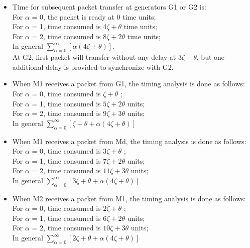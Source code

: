 \documentclass[letterpaper]{article}
\begin{document}
\begin{itemize}
	\item Time for subsequent packet transfer at generators G1 or G2 is:\\ For $\alpha$ = 0, the packet is ready at 0 time units;
\\ For $\alpha$ = 1, time consumed is 4$\zeta+\theta$ time units;
\\ For $\alpha$ = 2, time consumed is 8$\zeta+2\theta$ time units;
\\ In general $\displaystyle\sum\limits_{\alpha=0}^{\infty} [\alpha(4\zeta+\theta)]$.\\

At G2, first packet will transfer without any delay at $3\zeta+\theta$, but one additional delay is provided to synchronize with G2. 

\item When M1 receives a packet from G1, the timing analysis is done as follows:
\\ For $\alpha$ = 0, time consumed is $\zeta+\theta$ ;
\\For $\alpha$ = 1, time consumed is $5\zeta+2\theta$ units;
\\For $\alpha$ = 2, time consumed is $9\zeta+3\theta$ units;
\\ In general $\displaystyle\sum\limits_{\alpha=0}^{\infty} [\zeta+\theta+\alpha(4\zeta+\theta)]$ 

\item When M1 receives a packet from Md, the timing analysis is done as follows:
\\ For $\alpha$ = 0, time consumed is $3\zeta+\theta$ ;
\\For $\alpha$ = 1, time consumed is $7\zeta+2\theta$ units;
\\For $\alpha$ = 2, time consumed is $11\zeta+3\theta$ units;
\\ In general $\displaystyle\sum\limits_{\alpha=0}^{\infty} [3\zeta+\theta+\alpha(4\zeta+\theta)]$ 

\item When M2 receives a packet from M1, the timing analysis is done as follows:
\\ For $\alpha$ = 0, time consumed is $2\zeta+\theta$ ;
\\For $\alpha$ = 1, time consumed is $6\zeta+2\theta$ units;
\\For $\alpha$ = 2, time consumed is $10\zeta+3\theta$ units;
\\ In general $\displaystyle\sum\limits_{\alpha=0}^{\infty} [2\zeta+\theta+\alpha(4\zeta+\theta)]$ 


\end{itemize}
\end{document}
